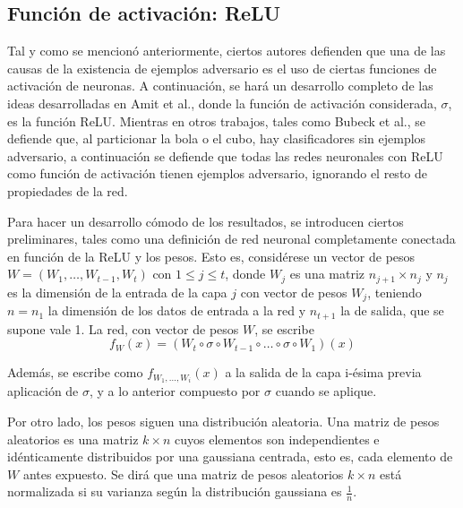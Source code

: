 
\subsection{Función de activación: ReLU}
Tal y como se mencionó anteriormente, ciertos autores defienden que una de las causas de la existencia de ejemplos adversario es el uso de ciertas funciones de activación de neuronas. A continuación, se hará un desarrollo completo de las ideas desarrolladas en Amit et al.\cite{FActivation}, donde la función de activación considerada, $\sigma$, es la función ReLU. Mientras en otros trabajos, tales como Bubeck et al.\cite{Partic}, se defiende que, al particionar la bola o el cubo, hay clasificadores sin ejemplos adversario, a continuación se defiende que todas las redes neuronales con ReLU como función de activación tienen ejemplos adversario, ignorando el resto de propiedades de la red.

Para hacer un desarrollo cómodo de los resultados, se introducen ciertos preliminares, tales como una definición de red neuronal completamente conectada en función de la ReLU y los pesos. Esto es, considérese un vector de pesos \(W=(W_1, \ldots, W_{t-1}, W_t)\) con \(1 \leq j \leq t\), donde \(W_j\) es una matriz \(n_{j+1} \times n_j\) y \(n_j\) es la dimensión de la entrada de la capa \(j\) con vector de pesos \(W_j\), teniendo \(n=n_1\) la dimensión de los datos de entrada a la red y \(n_{t+1}\) la de salida, que se supone vale 1. La red, con vector de pesos \(W\), se escribe
\[
f_{W}(x) = (W_t \circ \sigma \circ W_{t-1} \circ \ldots \circ \sigma \circ W_{1})(x)
\]

Además, se escribe como $f_{W_1,...,W_i}(x)$ a la salida de la capa i-ésima previa aplicación de $\sigma$, y a lo anterior compuesto por $\sigma$ cuando se aplique.

Por otro lado, los pesos siguen una distribución aleatoria. Una matriz de pesos aleatorios es una matriz $k \times n$ cuyos elementos son independientes e idénticamente distribuidos por una gaussiana centrada, esto es, cada elemento de $W$ antes expuesto. Se dirá que una matriz de pesos aleatorios $k \times n$ está normalizada si su varianza según la distribución gaussiana es $\frac{1}{n}$.

